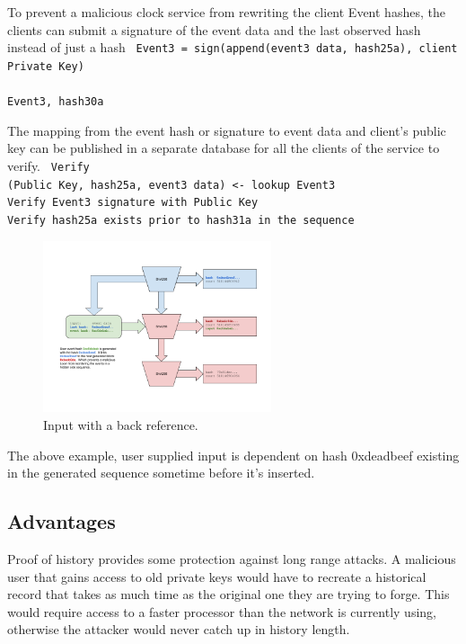 \documentclass[12pt]{article}
\begin{document}
To prevent a malicious clock service from rewriting the client Event hashes, the clients can submit a signature of the event data and the last observed hash instead of just a hash
\texttt{
\noindent Event3 = sign(append(event3 data, hash25a), client Private Key)\\\\\noindent
Event3, hash30a\\
}

The mapping from the event hash or signature to event data and client’s public key can be published in a separate database for all the clients of the service to verify.
\texttt{
Verify\\
(Public Key, hash25a, event3 data) <- lookup Event3 \\
Verify Event3 signature with Public Key\\
Verify hash25a exists prior to hash31a in the sequence\\
}

\begin{figure}
  \begin{center}
    \centering
    \includegraphics[width=0.6\textwidth]{figures/fig_6.png}
    \caption[Fig 6]{Input with a back reference.\label{fig_6}}
  \end{center}
  \end{figure}

The above example, user supplied input is dependent on hash 0xdeadbeef existing in the generated sequence sometime before it’s inserted.
\subsection{Advantages}

Proof of history provides some protection against long range attacks.  A malicious user that gains access to old private keys would have to recreate a historical record that takes as much time as the original one they are trying to forge.  This would require access to a faster processor than the network is currently using, otherwise the attacker would never catch up in history length.
\end{document}
